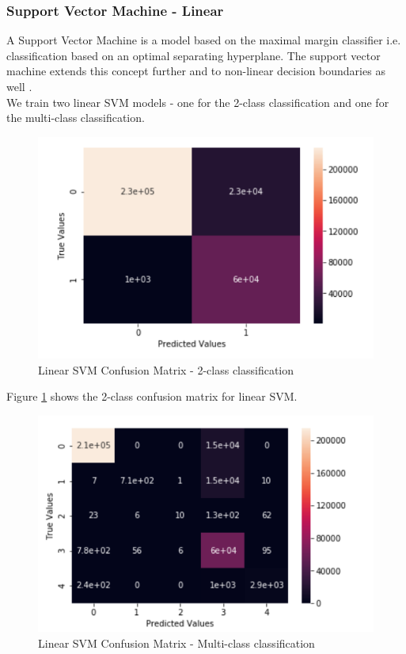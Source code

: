 \subsubsection{Support Vector Machine - Linear}
A Support Vector Machine is a model based on the maximal margin classifier i.e. classification based on an optimal separating hyperplane. The support vector machine extends this concept further and to non-linear decision boundaries as well \cite{islr09}.\\
We train two linear SVM models - one for the 2-class classification and one for the multi-class classification. 
\begin{figure}
	\includegraphics[width=1.0\columnwidth]{images/svm2.PNG}
	\caption{Linear SVM Confusion Matrix - 2-class classification}
	\label{F:linsvm2}
\end{figure}
Figure \ref{F:linsvm2} shows the 2-class confusion matrix for linear SVM.
\begin{figure}
	\includegraphics[width=1.0\columnwidth]{images/svmall.PNG}
	\caption{Linear SVM Confusion Matrix - Multi-class classification}
	\label{F:linsvmall}
\end{figure}
